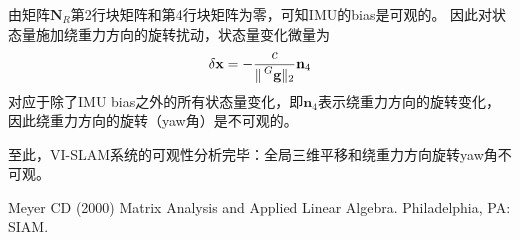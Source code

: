 \documentclass{article}
\begin{document}
由矩阵$\textbf{N}_R$第2行块矩阵和第4行块矩阵为零，可知IMU的bias是可观的。
因此对状态量施加绕重力方向的旋转扰动，状态量变化微量为
\begin{equation}
    \delta\textbf{x}=-\frac{c}{\lVert\sideset{^G}{}{\mathop{\textbf{g}}}\rVert_2}\textbf{n}_{4}
\end{equation}
对应于除了IMU bias之外的所有状态量变化，即$\textbf{n}_4$表示绕重力方向的旋转变化，因此绕重力方向的旋转（yaw角）是不可观的。

\par
至此，VI-SLAM系统的可观性分析完毕：全局三维平移和绕重力方向旋转yaw角不可观。











\begin{thebibliography}{99}  
    Meyer CD (2000) Matrix Analysis and Applied Linear Algebra. Philadelphia, PA: SIAM.
\end{thebibliography}
\end{document}
